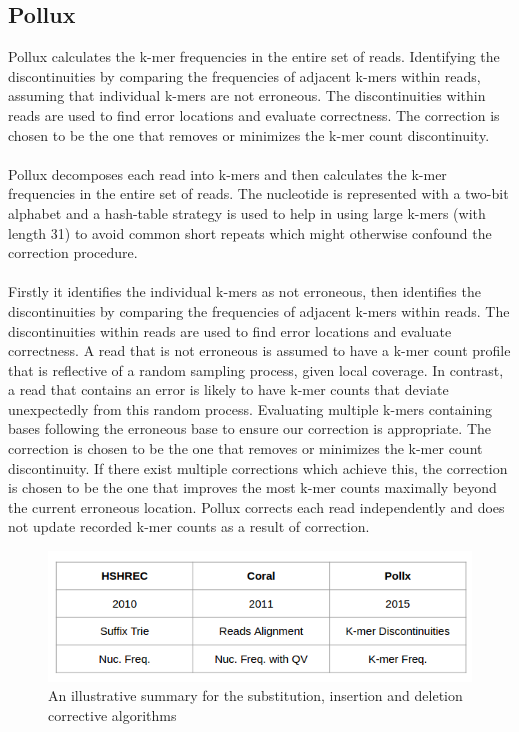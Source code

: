 \documentclass[12pt,openany]{llncs}
\begin{document}
\subsection{Pollux}
Pollux \cite{Pollux} calculates the k-mer frequencies in the entire set of reads. Identifying the discontinuities by comparing the frequencies of adjacent k-mers within reads, assuming that individual k-mers are not erroneous. The discontinuities within reads are used to find error locations and evaluate correctness. The correction is chosen to be the one that removes or minimizes the k-mer count discontinuity.
\\
\\
Pollux decomposes each read into k-mers and then calculates the k-mer frequencies in the entire set of reads. The nucleotide is represented with a two-bit alphabet and a hash-table strategy is used to help in using large k-mers (with length 31) to avoid common short repeats which might otherwise confound the correction procedure.
\\
\\
Firstly it identifies the individual k-mers as not erroneous, then identifies the discontinuities by comparing the frequencies of adjacent k-mers within reads. The discontinuities within reads are used to find error locations and evaluate correctness. A read that is not erroneous is assumed to have a k-mer count profile that is reflective of a random sampling process, given local coverage. In contrast, a read that contains an error is likely to have k-mer counts that deviate unexpectedly from this random process. Evaluating multiple k-mers containing bases following the erroneous base to ensure our correction is appropriate. The correction is chosen to be the one that removes or minimizes the k-mer count discontinuity. If there exist multiple corrections which achieve this, the correction is chosen to be the one that improves the most k-mer counts maximally beyond the current erroneous location. Pollux corrects each read independently and does not update recorded k-mer counts as a result of correction.
 
\begin{figure}
	\centering
	\includegraphics[width=.911\linewidth]{./figs/RW-2}
	\caption{\label{fig:fig-RW-2}An illustrative summary for the substitution, insertion and deletion corrective algorithms}
\end{figure}
\end{document}
